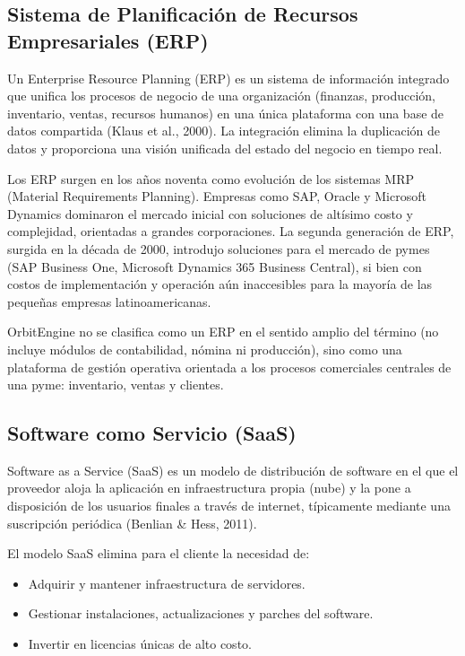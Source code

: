 \subsection{Sistema de Planificación de Recursos Empresariales (ERP)}\label{sistema-de-planificaciuxf3n-de-recursos-empresariales-erp}

Un Enterprise Resource Planning (ERP) es un sistema de información integrado que unifica los procesos de negocio de una organización (finanzas, producción, inventario, ventas, recursos humanos) en una única plataforma con una base de datos compartida (Klaus et al., 2000). La integración elimina la duplicación de datos y proporciona una visión unificada del estado del negocio en tiempo real.

Los ERP surgen en los años noventa como evolución de los sistemas MRP (Material Requirements Planning). Empresas como SAP, Oracle y Microsoft Dynamics dominaron el mercado inicial con soluciones de altísimo costo y complejidad, orientadas a grandes corporaciones. La segunda generación de ERP, surgida en la década de 2000, introdujo soluciones para el mercado de pymes (SAP Business One, Microsoft Dynamics 365 Business Central), si bien con costos de implementación y operación aún inaccesibles para la mayoría de las pequeñas empresas latinoamericanas.

OrbitEngine no se clasifica como un ERP en el sentido amplio del término (no incluye módulos de contabilidad, nómina ni producción), sino como una plataforma de gestión operativa orientada a los procesos comerciales centrales de una pyme: inventario, ventas y clientes.

\subsection{Software como Servicio (SaaS)}\label{software-como-servicio-saas}

Software as a Service (SaaS) es un modelo de distribución de software en el que el proveedor aloja la aplicación en infraestructura propia (nube) y la pone a disposición de los usuarios finales a través de internet, típicamente mediante una suscripción periódica (Benlian \& Hess, 2011).

El modelo SaaS elimina para el cliente la necesidad de:

\begin{itemize}
\tightlist
\item
  Adquirir y mantener infraestructura de servidores.
\item
  Gestionar instalaciones, actualizaciones y parches del software.
\item
  Invertir en licencias únicas de alto costo.
\end{itemize}

